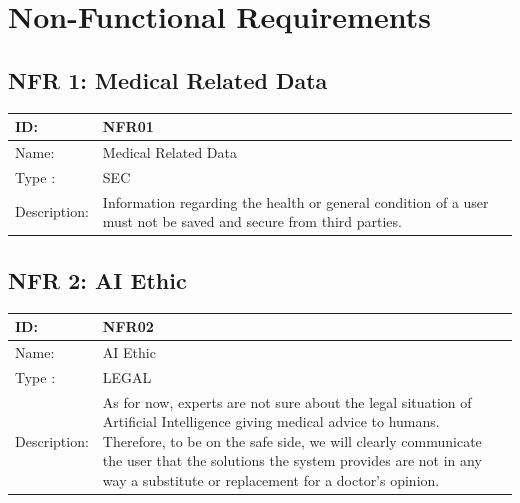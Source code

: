 \documentclass[12pt]{article}
\theoremstyle{definition}
\begin{document}
\pagebreak













\section{Non-Functional Requirements}

\subsection{NFR 1: Medical Related Data}
\begin{tabular}{|p{.2\linewidth}|p{.65\linewidth}|}
\hline 
ID: & NFR01 \\ \hline
Name: & Medical Related Data \\ \hline
Type	: & SEC \\ \hline
Description: &  Information regarding the health or general condition of a user must not be saved and secure from third parties.\\ \hline
\end{tabular}

\subsection{NFR 2: AI Ethic}
\begin{tabular}{|p{.2\linewidth}|p{.65\linewidth}|}
\hline 
ID: & NFR02 \\ \hline
Name: & AI Ethic \\ \hline
Type	: & LEGAL \\ \hline
Description: & As for now, experts are not sure about the legal situation of Artificial Intelligence giving medical advice to humans. Therefore, to be on the safe side, we will clearly communicate the user that the solutions the system provides are not in any way a substitute or replacement for a doctor's opinion. \\ \hline
\end{tabular}
\end{document}
